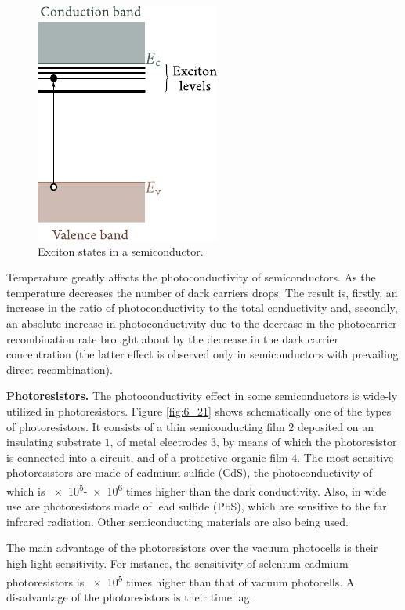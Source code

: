 \begin{figure}[t]
	\begin{center}
		\includegraphics[scale=1]{figures/ch_06/fig_6_20.pdf}
		\caption[]{Exciton states in a semiconductor.}
		\label{fig:6_20}
	\end{center}
	\vspace{-0.7cm}
\end{figure}

Temperature greatly affects the photoconductivity of semiconductors. As the temperature decreases the number of dark carriers drops. The result is, firstly, an increase in the ratio of photoconductivity to the total conductivity and, secondly, an absolute increase in photoconductivity due to the decrease in the photocarrier recombination rate brought about by the decrease in the dark carrier concentration (the latter effect is observed only in semiconductors with prevailing direct recombination).

\textbf{Photoresistors.} The photoconductivity effect in some semiconductors is wide-ly utilized in photoresistors. Figure \ref{fig:6_21} shows schematically one of the types of photoresistors. It consists of a thin semiconducting film $2$ deposited on an insulating substrate $1$, of metal electrodes $3$, by means of which the photoresistor is connected into a circuit, and of a protective organic film $4$. The most sensitive photoresistors
are made of cadmium sulfide (CdS), the photoconductivity of which is \num{e5}-\num{e6} times higher than the dark conductivity. Also, in wide use are photoresistors made of lead sulfide (PbS), which are sensitive to the far infrared radiation. Other semiconducting materials are also being used.

The main advantage of the photoresistors over the vacuum photocells is their high light sensitivity. For instance, the sensitivity of selenium-cadmium photoresistors is \num{e5} times higher than that of
vacuum photocells. A disadvantage of the photoresistors is their time lag.

